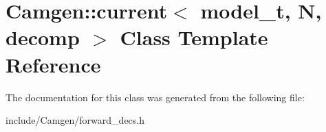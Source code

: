 \hypertarget{a00106}{}\section{Camgen\+:\+:current$<$ model\+\_\+t, N, decomp $>$ Class Template Reference}
\label{a00106}


The documentation for this class was generated from the following file\+:\begin{DoxyCompactItemize}
\item 
include/\+Camgen/forward\+\_\+decs.\+h\end{DoxyCompactItemize}
